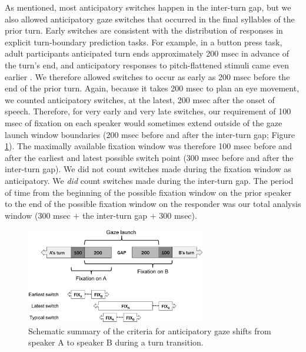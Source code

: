 \documentclass[authoryear, 12pt]{elsarticle}
\begin{document}
As mentioned, most anticipatory switches happen in the inter-turn gap, but we also allowed anticipatory gaze switches that occurred in the final syllables of the prior turn. Early switches are consistent with the distribution of responses in explicit turn-boundary prediction tasks. For example, in a button press task, adult participants anticipated turn ends approximately 200 msec in advance of the turn's end, and anticipatory responses to pitch-flattened stimuli came even earlier \citep{de-ruiter2006}. We therefore allowed switches to occur as early as 200 msec before the end of the prior turn. Again, because it takes 200 msec to plan an eye movement, we counted anticipatory switches, at the latest, 200 msec after the onset of speech. Therefore, for very early and very late switches, our requirement of 100 msec of fixation on each speaker would sometimes extend outside of the gaze launch window boundaries (200 msec before and after the inter-turn gap; Figure \ref{fig:criterion}). The maximally available fixation window was therefore 100 msec before and after the earliest and latest possible switch point (300 msec before and after the inter-turn gap). We did not count switches made during the fixation window as anticipatory. We \textit{did} count switches made during the inter-turn gap. The period of time from the beginning of the possible fixation window on the prior speaker to the end of the possible fixation window on the responder was our total analysis window (300 msec $+$ the inter-turn gap $+$ 300 msec).

\begin{figure}[t]
\begin{center}
\includegraphics[width=0.7\textwidth]{figures/FIG-AnticipCriteria.png}
\end{center}
\caption{Schematic summary of the criteria for anticipatory gaze shifts from speaker A to speaker B during a turn transition.}
\label{fig:criterion}
\end{figure}
\end{document}
